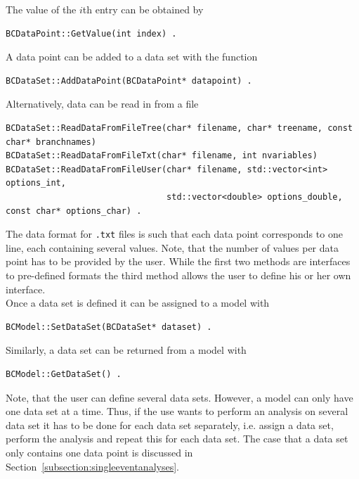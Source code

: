 \documentclass[11pt, a4paper]{article}
\begin{document}
\noindent 
The value of the $i$th entry can be obtained by 
%
\begin{verbatim}
BCDataPoint::GetValue(int index) . 
\end{verbatim} 

\noindent 
A data point can be added to a data set with the function

\begin{verbatim} 
BCDataSet::AddDataPoint(BCDataPoint* datapoint) . 
\end{verbatim} 

\noindent 
Alternatively, data can be read in from a file
%
\begin{small}
\begin{verbatim}
BCDataSet::ReadDataFromFileTree(char* filename, char* treename, const char* branchnames)
BCDataSet::ReadDataFromFileTxt(char* filename, int nvariables)
BCDataSet::ReadDataFromFileUser(char* filename, std::vector<int> options_int,
                                std::vector<double> options_double, const char* options_char) . 
\end{verbatim} 
\end{small} 

\noindent 
The data format for \verb|.txt| files is such that each data point
corresponds to one line, each containing several values. Note, that the
number of values per data point has to be provided by the user. While
the first two methods are interfaces to pre-defined formats the third
method allows the user to define his or her own interface. \\

\noindent 
Once a data set is defined it can be assigned to a model with
%
\begin{verbatim}
BCModel::SetDataSet(BCDataSet* dataset) . 
\end{verbatim} 

\noindent 
Similarly, a data set can be returned from a model with 
%
\begin{verbatim}
BCModel::GetDataSet() . 
\end{verbatim} 

\noindent 
Note, that the user can define several data sets. However, a model can only have one data set 
at a time. Thus, if the use wants to perform an analysis on several data set it has to be done 
for each data set separately, i.e. assign a data set, perform the analysis and repeat this for 
each data set. The case that a data set only contains one data point is discussed in Section~\ref{subsection:singleeventanalyses}. 
\end{document}
